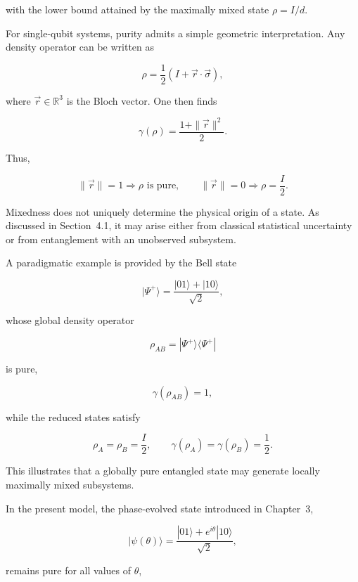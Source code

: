 with the lower bound attained by the maximally mixed state \( \rho = I/d \).

\medskip

For single-qubit systems, purity admits a simple geometric interpretation. Any density operator can be written as

\begin{equation}
\rho
=
\frac{1}{2}
\left(
I + \vec{r}\cdot\vec{\sigma}
\right),
\label{eq:single_qubit_bloch_representation}
\end{equation}

where \( \vec{r} \in \mathbb{R}^3 \) is the Bloch vector. One then finds

\begin{equation}
\gamma(\rho)
=
\frac{1+\|\vec{r}\|^2}{2}.
\label{eq:single_qubit_purity_bloch}
\end{equation}

Thus,

\[
\|\vec{r}\| = 1
\Rightarrow
\rho \text{ is pure},
\qquad
\|\vec{r}\| = 0
\Rightarrow
\rho = \frac{I}{2}.
\]

\medskip

Mixedness does not uniquely determine the physical origin of a state. As discussed in Section~4.1, it may arise either from classical statistical uncertainty or from entanglement with an unobserved subsystem.

\medskip

A paradigmatic example is provided by the Bell state

\[
|\Psi^+\rangle
=
\frac{|01\rangle + |10\rangle}{\sqrt{2}},
\]

whose global density operator

\[
\rho_{AB}
=
|\Psi^+\rangle\langle\Psi^+|
\]

is pure,

\[
\gamma(\rho_{AB}) = 1,
\]

while the reduced states satisfy

\[
\rho_A
=
\rho_B
=
\frac{I}{2},
\qquad
\gamma(\rho_A)
=
\gamma(\rho_B)
=
\frac{1}{2}.
\]

This illustrates that a globally pure entangled state may generate locally maximally mixed subsystems.

\medskip

In the present model, the phase-evolved state introduced in Chapter~3,

\[
|\psi(\theta)\rangle
=
\frac{|01\rangle + e^{i\theta}|10\rangle}{\sqrt{2}},
\]

remains pure for all values of \( \theta \),


